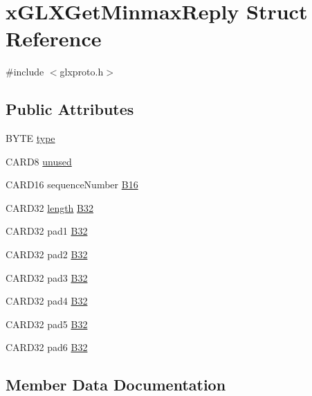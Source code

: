 \hypertarget{structx_g_l_x_get_minmax_reply}{}\section{x\+G\+L\+X\+Get\+Minmax\+Reply Struct Reference}
\label{structx_g_l_x_get_minmax_reply}


{\ttfamily \#include $<$glxproto.\+h$>$}

\subsection*{Public Attributes}
\begin{DoxyCompactItemize}
\item 
B\+Y\+TE \hyperlink{structx_g_l_x_get_minmax_reply_a0beb687ddf2e37dbf281e58ee185a825}{type}
\item 
C\+A\+R\+D8 \hyperlink{structx_g_l_x_get_minmax_reply_a17a726037f6ed86cfba9832864ad0f01}{unused}
\item 
C\+A\+R\+D16 sequence\+Number \hyperlink{structx_g_l_x_get_minmax_reply_a1a6a5dd444e1777a56ce8cb97a0c297b}{B16}
\item 
C\+A\+R\+D32 \hyperlink{glcorearb_8h_ab9c919755bde3b34349e23a32b4e0fa7}{length} \hyperlink{structx_g_l_x_get_minmax_reply_a1c293c2e7cdbd7d88e511d8c2b74be60}{B32}
\item 
C\+A\+R\+D32 pad1 \hyperlink{structx_g_l_x_get_minmax_reply_aa70865a02f36c1d7eb4a2997aa49ba12}{B32}
\item 
C\+A\+R\+D32 pad2 \hyperlink{structx_g_l_x_get_minmax_reply_a62e8e96317580ad8131a99965bcb6b0a}{B32}
\item 
C\+A\+R\+D32 pad3 \hyperlink{structx_g_l_x_get_minmax_reply_a3ebf9b4e303c48421952083588058690}{B32}
\item 
C\+A\+R\+D32 pad4 \hyperlink{structx_g_l_x_get_minmax_reply_a08f357fc16be8743f1ca93608b614366}{B32}
\item 
C\+A\+R\+D32 pad5 \hyperlink{structx_g_l_x_get_minmax_reply_a5c4a06ef0dc83a75118318dc7d322c6f}{B32}
\item 
C\+A\+R\+D32 pad6 \hyperlink{structx_g_l_x_get_minmax_reply_a4061432c356975ca08cf471f94f3c9eb}{B32}
\end{DoxyCompactItemize}


\subsection{Member Data Documentation}
\mbox{\label{structx_g_l_x_get_minmax_reply_a1a6a5dd444e1777a56ce8cb97a0c297b}} 
